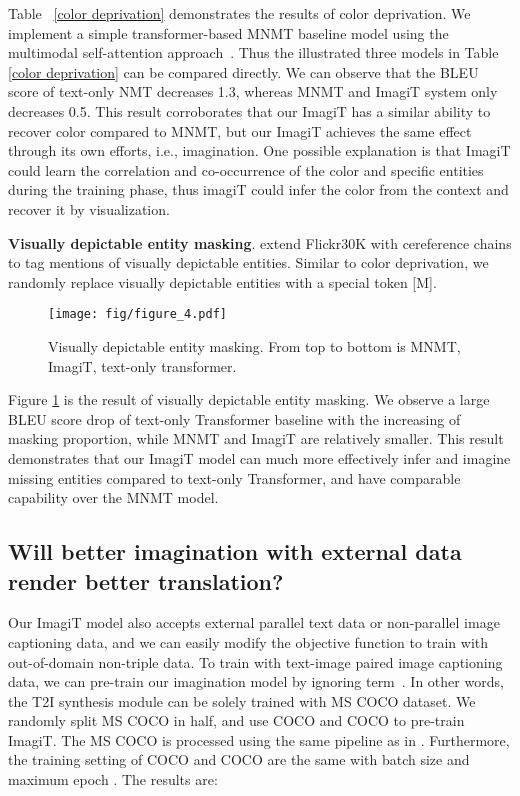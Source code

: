 \documentclass[11pt]{article}
\newcommand{\method}{ImagiT\xspace}
\begin{document}
Table ~\ref{color deprivation} demonstrates the results of color deprivation. We implement a simple transformer-based MNMT baseline model using the multimodal self-attention approach~\cite{yao2020multimodal}. Thus the illustrated three models in Table \ref{color deprivation} can be compared directly. We can observe that the BLEU score of text-only NMT decreases 1.3, whereas MNMT and \method system only decreases 0.5. This result corroborates that our \method has a similar ability to recover color compared to MNMT, but our \method achieves the same effect through its own efforts, i.e., imagination. One possible explanation is that \method could learn the correlation and co-occurrence of the color and specific entities during the training phase, thus imagiT could infer the color from the context and recover it by visualization.

\textbf{Visually depictable entity masking}. \citet{plummer2015flickr30k} extend Flickr30K with cereference chains to tag mentions of visually depictable entities. Similar to color deprivation, we randomly replace  visually depictable entities with a special token [M].

\begin{figure}[ht]
\centering
\texttt{[image: fig/figure\_4.pdf]} \caption{Visually depictable entity masking. From top to bottom is MNMT, \method, text-only transformer.}
\label{fig4}
\end{figure}

Figure \ref{fig4} is the result of visually depictable entity masking. We observe a large BLEU score drop of text-only Transformer baseline with the increasing of masking proportion, while MNMT and \method are relatively smaller. This result demonstrates that our \method model can much more effectively infer and imagine missing entities compared to text-only Transformer, and have comparable capability over the MNMT model.

\subsection{Will better imagination with external data render better translation?}

Our \method model also accepts external parallel text data or non-parallel image captioning data, and we can easily modify the objective function to train with out-of-domain non-triple data. To train with text-image paired image captioning data, we can pre-train our imagination model by ignoring  term~\cite{yang2020towards}. In other words, the T2I synthesis module can be solely trained with MS COCO dataset. We randomly split MS COCO in half, and use COCO and COCO to pre-train \method. The MS COCO is processed using the same pipeline as in \citet{zhang2017stackgan}. Furthermore, the training setting of COCO and COCO are the same with batch size  and maximum epoch . The results are:
\end{document}
